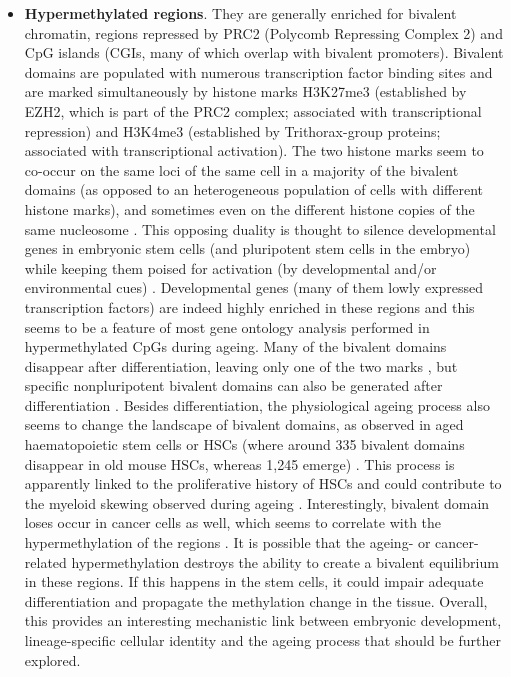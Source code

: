 \begin{itemize}
	
	\item \textbf{Hypermethylated regions}. They are generally enriched for bivalent chromatin, regions repressed by \acrshort{PRC2} (Polycomb Repressing Complex 2) and CpG islands (\acrshort{CGI}s, many of which overlap with bivalent promoters). Bivalent domains are populated with numerous transcription factor binding sites and are marked simultaneously by histone marks H3K27me3 (established by EZH2, which is part of the PRC2 complex; associated with transcriptional repression) and H3K4me3 (established by Trithorax-group proteins; associated with transcriptional activation). The two histone marks seem to co-occur on the same loci of the same cell in a majority of the bivalent domains (as opposed to an heterogeneous population of cells with different histone marks), and sometimes even on the different histone copies of the same nucleosome \citep{Voigt2013}. This opposing duality is thought to silence developmental genes in embryonic stem cells (and pluripotent stem cells in the embryo) while keeping them poised for activation (by developmental and/or environmental cues) \citep{Voigt2013}. Developmental genes (many of them lowly expressed transcription factors) are indeed highly enriched in these regions and this seems to be a feature of most gene ontology analysis performed in hypermethylated CpGs during ageing. Many of the bivalent domains disappear after differentiation, leaving only one of the two marks \citep{Bernstein2006}, but specific nonpluripotent bivalent domains can also be generated after differentiation \citep{Voigt2013}. Besides differentiation, the physiological ageing process also seems to change the landscape of bivalent domains, as observed in aged haematopoietic stem cells or \acrshort{HSCs} (where around 335 bivalent domains disappear in old mouse HSCs, whereas 1,245 emerge) \citep{Sun2014x}. This process is apparently linked to the proliferative history of \acrshort{HSCs} \citep{Beerman2013} and could contribute to the myeloid skewing observed during ageing \citep{Sun2014x,Beerman2013}. Interestingly, bivalent domain loses occur in cancer cells as well, which seems to correlate with the hypermethylation of the regions \citep{Bernhart2016}. It is possible that the ageing- or cancer-related hypermethylation destroys the ability to create a bivalent equilibrium in these regions. If this happens in the stem cells, it could impair adequate differentiation and propagate the methylation change in the tissue. Overall, this provides an interesting mechanistic link between embryonic development, lineage-specific cellular identity and the ageing process that should be further explored.   
	

\end{itemize}
